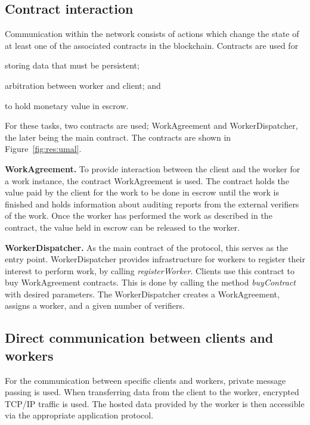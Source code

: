 \subsection{Contract interaction}
\label{sec:res:contract}
Communication within the network consists of actions which change the state of at least one of the associated contracts in the blockchain. Contracts are used for
\begin{inparaenum}
\item storing data that must be persistent;
\item arbitration between worker and client; and
\item to hold monetary value in escrow.
\end{inparaenum}
For these tasks, two contracts are used; WorkAgreement and WorkerDispatcher, the later being the main contract. The contracts are shown in Figure~\ref{fig:res:umal}.

\textbf{WorkAgreement.} To provide interaction between the client and the worker for a work instance, the contract WorkAgreement is used. The contract holds the value paid by the client for the work to be done in escrow until the work is finished and holds information about auditing reports from the external verifiers of the work. Once the worker has performed the work as described in the contract, the value held in escrow can be released to the worker.

\textbf{WorkerDispatcher.} As the main contract of the protocol, this serves as the entry point. WorkerDispatcher provides infrastructure for workers to register their interest to perform work, by calling \textit{registerWorker}. Clients use this contract to buy WorkAgreement contracts. This is done by calling the method \textit{buyContract} with desired parameters. The WorkerDispatcher creates a WorkAgreement, assigns a worker, and a given number of verifiers.

\subsection{Direct communication between clients and workers}
\label{sec:res:communication}
For the communication between specific clients and workers, private message passing is used. When transferring data from the client to the worker, encrypted TCP/IP traffic is used. The hosted data provided by the worker is then accessible via the appropriate application protocol.

